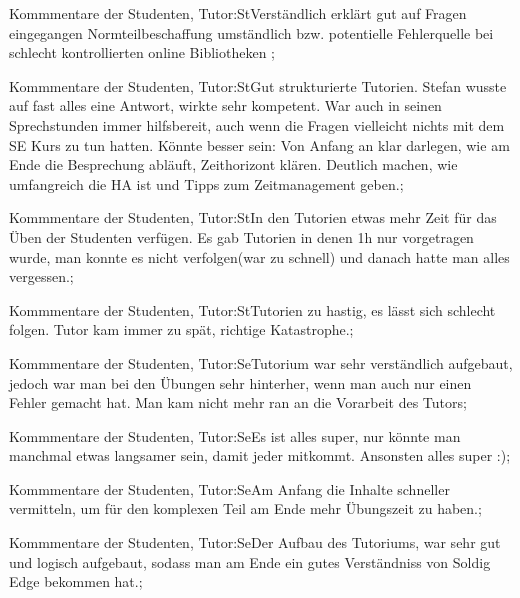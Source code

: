 \documentclass[10pt]{beamer}
\begin{document}
\begin{frame}[fragile]{Kommmentare der Studenten, Tutor:St}Verständlich erklärt
 gut auf Fragen eingegangen
 Normteilbeschaffung umständlich bzw. potentielle Fehlerquelle bei schlecht kontrollierten online Bibliotheken
 ;
 \end{frame}
\begin{frame}[fragile]{Kommmentare der Studenten, Tutor:St}Gut strukturierte Tutorien. Stefan wusste auf fast alles eine Antwort, wirkte sehr kompetent. War auch in seinen Sprechstunden immer hilfsbereit, auch wenn die Fragen vielleicht nichts mit dem SE Kurs zu tun hatten.
 Könnte besser sein: Von Anfang an klar darlegen, wie am Ende die Besprechung abläuft, Zeithorizont klären. Deutlich machen, wie umfangreich die HA ist und Tipps zum Zeitmanagement geben.;
 \end{frame}
\begin{frame}[fragile]{Kommmentare der Studenten, Tutor:St}In den Tutorien etwas mehr Zeit für das Üben der Studenten verfügen. Es gab Tutorien in denen 1h nur vorgetragen wurde, man konnte es nicht verfolgen(war zu schnell) und danach hatte man alles vergessen.;
 \end{frame}
\begin{frame}[fragile]{Kommmentare der Studenten, Tutor:St}Tutorien zu hastig, es lässt sich schlecht folgen. Tutor kam immer zu spät, richtige Katastrophe.;
 \end{frame}
\begin{frame}[fragile]{Kommmentare der Studenten, Tutor:Se}Tutorium war sehr verständlich aufgebaut, jedoch war man bei den Übungen sehr hinterher, wenn man auch nur einen Fehler gemacht hat. Man kam nicht mehr ran an die Vorarbeit des Tutors;
 \end{frame}
\begin{frame}[fragile]{Kommmentare der Studenten, Tutor:Se}Es ist alles super, nur könnte man manchmal etwas langsamer sein, damit jeder mitkommt. Ansonsten alles super :);
 \end{frame}
\begin{frame}[fragile]{Kommmentare der Studenten, Tutor:Se}Am Anfang die Inhalte schneller vermitteln, um für den komplexen Teil am Ende mehr Übungszeit zu haben.;
 \end{frame}
\begin{frame}[fragile]{Kommmentare der Studenten, Tutor:Se}Der Aufbau des Tutoriums, war sehr gut und logisch aufgebaut, sodass man am Ende ein gutes Verständniss von Soldig Edge bekommen hat.;
 \end{frame}
\end{document}
